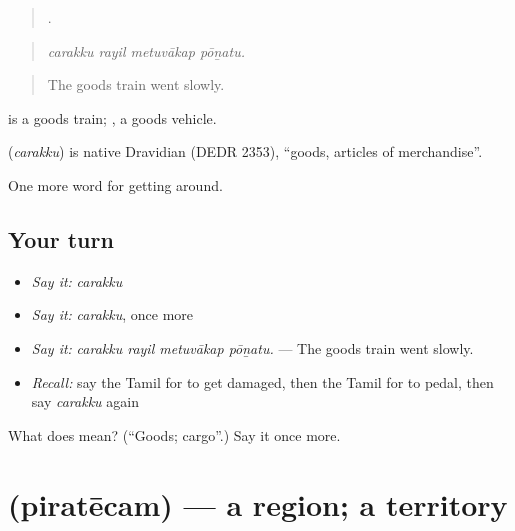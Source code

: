 \begin{quote}
   .
\end{quote}

\begin{quote}
\emph{carakku rayil metuvākap pōṉatu.}
\end{quote}

\begin{quote}
The goods train went slowly.
\end{quote}

  is a goods train;  , a goods vehicle.

\begin{cousinweb}
\textbf{} (\emph{carakku}) is native Dravidian (DEDR 2353), \textquotedblleft{}goods, articles of merchandise\textquotedblright{}.
\end{cousinweb}

\begin{grammarlens}[title={What you've built}]
One more word for getting around.
\end{grammarlens}

\subsection*{Your turn}
\begin{itemize}
\raggedright
  \item \emph{Say it:} \emph{carakku}
  \item \emph{Say it:} \emph{carakku}, once more
  \item \emph{Say it:} \emph{carakku rayil metuvākap pōṉatu.} — The goods train went slowly.
  \item \emph{Recall:} say the Tamil for to get damaged, then the Tamil for to pedal, then say \emph{carakku} again
\end{itemize}

\begin{tcolorbox}[breakable,colback=teal!4,colframe=teal!35!black,title={Before you move on}]
What does  mean? (\textquotedblleft{}Goods; cargo\textquotedblright{}.) Say it once more.
\end{tcolorbox}
\section[\texorpdfstring{\ta{பிரதேசம்} (piratēcam)}{பிரதேசம் (piratēcam)}]{ (piratēcam) — a region; a territory}


